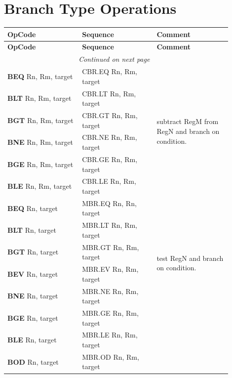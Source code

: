 \section*{Branch Type Operations}

\begin{longtable}{@{}p{0.3\linewidth}p{0.3\linewidth}p{0.3\linewidth}@{}}
    \toprule
    \textbf{OpCode} & \textbf{Sequence} & \textbf{Comment} \\
    \midrule
    \endfirsthead
    \toprule
    \textbf{OpCode} & \textbf{Sequence} & \textbf{Comment} \\
    \midrule
    \endhead
    \midrule
    \multicolumn{2}{r}{\textit{Continued on next page}} \\
    \midrule
    \endfoot
    \bottomrule
    \endlastfoot
    
    \textbf{BEQ} Rn, Rm, target & CBR.EQ Rn, Rm, target &
         \multirow{6}{*}{\parbox{1\linewidth}{subtract RegM from RegN and branch on condition.}} \\
    \textbf{BLT} Rn, Rm, target & CBR.LT Rn, Rm, target &  \\
    \textbf{BGT} Rn, Rm, target & CBR.GT Rn, Rm, target &  \\
    \textbf{BNE} Rn, Rm, target & CBR.NE Rn, Rm, target &  \\
    \textbf{BGE} Rn, Rm, target & CBR.GE Rn, Rm, target &  \\
    \textbf{BLE} Rn, Rm, target & CBR.LE Rn, Rm, target &  \\
    \midrule
    
    \textbf{BEQ} Rn, target & MBR.EQ Rn, Rn, target &
         \multirow{6}{*}{\parbox{1\linewidth}{test RegN and branch on condition.}} \\
    \textbf{BLT} Rn, target & MBR.LT Rn, Rm, target &  \\
    \textbf{BGT} Rn, target & MBR.GT Rn, Rm, target &  \\
    \textbf{BEV} Rn, target & MBR.EV Rn, Rm, target &  \\
    \textbf{BNE} Rn, target & MBR.NE Rn, Rm, target &  \\
    \textbf{BGE} Rn, target & MBR.GE Rn, Rm, target &  \\
    \textbf{BLE} Rn, target & MBR.LE Rn, Rm, target &  \\
    \textbf{BOD} Rn, target & MBR.OD Rn, Rm, target &  \\
    \midrule
    
\end{longtable}





	
